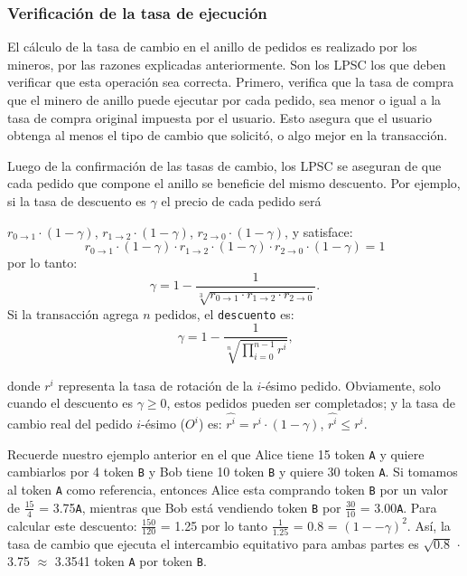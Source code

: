 \documentclass[UTF8,nofonts]{article}
\begin{document}
\begin{multicols}{2}
\subsubsection{Verificaci\'on de la tasa de ejecuci\'on\label{sec:fill_rate_check}}

El c\'alculo de la tasa de cambio en el anillo de pedidos es realizado por los mineros, por las razones explicadas anteriormente. Son los LPSC los que deben verificar que esta operaci\'on sea correcta. Primero, verifica que la tasa de compra que el minero de anillo puede ejecutar por cada pedido, sea menor o igual a la tasa de compra original impuesta por el usuario. Esto asegura que el usuario obtenga al menos el tipo de cambio que solicit\'o, o algo mejor en la transacci\'on.

Luego de la confirmaci\'on de las tasas de cambio, los LPSC se aseguran de que cada pedido que compone el anillo se beneficie del mismo descuento. Por ejemplo, si la tasa de descuento es $\gamma$ el precio de cada pedido ser\'a


$r_{0\rightarrow 1} \cdot (1-\gamma)$, $r_{1\rightarrow 2} \cdot (1-\gamma)$, $r_{2 \rightarrow 0} \cdot (1-\gamma)$, y satisface: 
\begin{equation}
r_{0\rightarrow 1} \cdot (1-\gamma)\cdot r_{1\rightarrow 2} \cdot (1-\gamma) \cdot r_{2 \rightarrow 0} \cdot (1-\gamma) = 1
\end{equation}
por lo tanto: 
\begin{equation}
\gamma = 1- \frac{1}{\sqrt[3]{r_{0\rightarrow 1} \cdot r_{1\rightarrow 2} \cdot r_{2\rightarrow 0}}}\text{.}
\end{equation}
Si la transacci\'on agrega $n$ pedidos, el \texttt{descuento} es: 
\begin{equation}
\gamma = 1- \frac{1}{\sqrt[n]{\prod_{i=0}^{n-1} r^i}} \text{,}
\end{equation}

donde $r^i$ representa la tasa de rotaci\'on de la $i$-\'esimo pedido. Obviamente, solo cuando el descuento es $\gamma \ge 0$, estos pedidos pueden ser completados; y la tasa de cambio real del pedido $i$-\'esimo ($O^i$) es: $\hat{r^i} = r^i \cdot (1-\gamma)$, $\hat{r^i}\le r^i$.

Recuerde nuestro ejemplo anterior en el que Alice tiene 15 token \verb|A|  y quiere cambiarlos por 4 token \verb|B| y Bob tiene 10 token \verb|B| y quiere 30 token \verb|A|. Si tomamos al token \verb|A| como referencia, entonces Alice esta comprando token \verb|B| por un valor de $\frac{15}{4}$ = 3.75\verb|A|, mientras que Bob est\'a vendiendo token \verb|B| por $\frac{30}{10}$ = 3.00\verb|A|. Para calcular este descuento: $\frac{150}{120}$ = 1.25 por lo tanto $\frac{1}{1.25}$ = 0.8 = $(1 −- \gamma)^2$. As\'i, la tasa de cambio que ejecuta el intercambio equitativo para ambas partes es $\sqrt{0.8}$ $\cdot$ 3.75 $\approx$ 3.3541 token \verb|A| por token \verb|B|.


\end{multicols}
\end{document}
